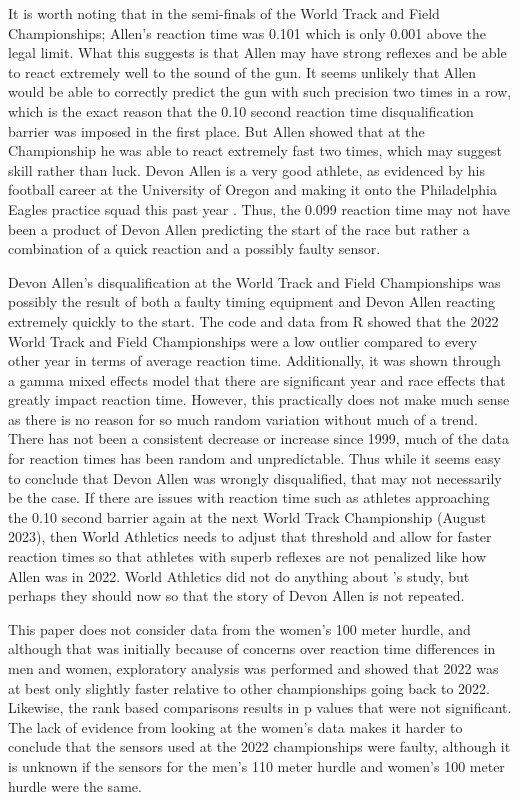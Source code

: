 \documentclass[12pt, letterpaper, titlepage]{article}
\begin{document}
It is worth noting that in the semi-finals of the World Track and
Field Championships; Allen's reaction time was 0.101 which is only 0.001 above
the legal limit.  What this suggests is that Allen may have strong reflexes
and be able to react extremely well to the sound of the gun.  It seems unlikely that
Allen would be able to correctly predict the gun with such precision two times in a row,
which is the exact reason that the 0.10 second reaction time disqualification barrier was
imposed in the first place.  But Allen showed that at the Championship he was able to
react extremely fast two times, which may suggest skill rather than luck. Devon 
Allen is a very good athlete, as evidenced by his football career at the University of Oregon
and making it onto the Philadelphia Eagles practice squad this past year 
\citep{hurley2022eagles}. Thus, the 0.099 reaction time may not have been 
a product of Devon Allen predicting the start of the race but rather a 
combination of a quick reaction and a possibly faulty sensor.

Devon Allen's disqualification at the World Track and Field Championships was
possibly the result of both a faulty timing equipment and Devon Allen
reacting extremely quickly to the start.  The code and data from R showed that
the 2022 World Track and Field Championships were a low outlier compared to
every other year in terms of average reaction time.  Additionally, it was shown
through a gamma mixed effects model that there are significant year and race
effects that greatly impact reaction time.  However, this practically does not make much sense
as there is no reason for so much random variation without much of a trend.
There has not been a consistent decrease or increase since 1999, much of the data
for reaction times has been random and unpredictable.  Thus while it seems easy
to conclude that Devon Allen was wrongly disqualified, that may not necessarily
be the case.  If there are issues with reaction time such as athletes approaching the 0.10 
second barrier again at the next World Track Championship (August 2023), then World Athletics 
needs to adjust that threshold and allow for faster reaction times so that athletes with superb 
reflexes are not penalized like how Allen was in 2022.  World Athletics did not
do anything about \citet{komi2009iaaf}'s study, but perhaps they should now so
that the story of Devon Allen is not repeated.

This paper does not consider data from the women's 100 meter hurdle, and although
that was initially because of concerns over reaction time differences in men and
women, exploratory analysis was performed and showed that 2022 was at best only
slightly faster relative to other championships going back to 2022.  Likewise,
the rank based comparisons results in p values that were not significant.  The
lack of evidence from looking at the women's data makes it harder to conclude 
that the sensors used at the 2022 championships were faulty, although it is
unknown if the sensors for the men's 110 meter hurdle and women's 100 meter
hurdle were the same.
\end{document}
